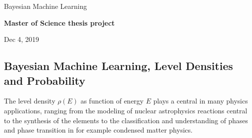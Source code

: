 \documentclass[%
oneside,                 %
final,                   %
10pt]{article}
\begin{document}

\newcommand{\exercisesection}[1]{\subsection*{#1}}






\thispagestyle{empty}

\begin{center}
{\LARGE\bf
\begin{spacing}{1.25}
Bayesian Machine Learning
\end{spacing}
}
\end{center}


\begin{center}
{\bf Master of Science thesis project${}^{}$} \\ [0mm]
\end{center}

\begin{center}
\end{center}
    

\begin{center}
Dec 4, 2019
\end{center}

\vspace{1cm}


\subsection*{Bayesian Machine Learning, Level Densities and Probability}

The level density $\rho(E)$ as function of energy $E$ plays a central in many
physics applications, ranging from the modeling of nuclear
astrophysics reactions central to the synthesis of the elements to the
classification and understanding of phases and phase transition in for example condensed matter
physics.
\end{document}
